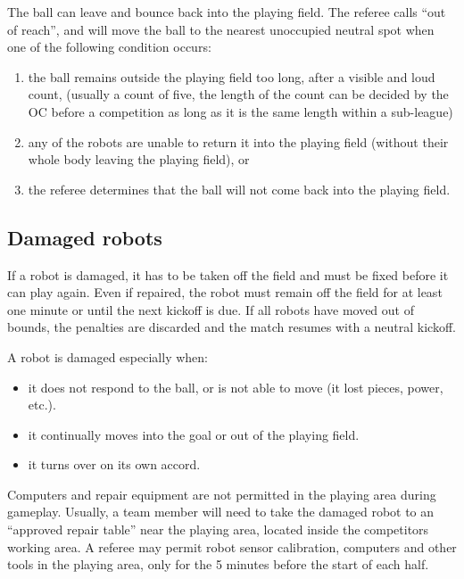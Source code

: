 \documentclass{article}
\begin{document}
The ball can leave and bounce back into the playing field. The referee calls ``out of reach'', and will move the ball to the nearest unoccupied neutral spot when one of the following condition occurs:

\begin{enumerate}
    \item the ball remains outside the playing field too long, after a visible and loud count, (usually a count of five, the length of the count can be decided by the OC before a competition as long as it is the same length within a sub-league)
    \item any of the robots are unable to return it into the playing field (without their whole body leaving the playing field), or
    \item the referee determines that the ball will not come back into the playing field.
\end{enumerate}

\subsection{Damaged robots \label{ref-012}}

If a robot is damaged, it has to be taken off the field and must be fixed before it can play again. Even if repaired, the robot must remain off the field for at least one minute or until the next kickoff is due. If all robots have moved out of bounds, the penalties are discarded and the match resumes with a neutral kickoff.

A robot is damaged especially when:

\begin{itemize}
\item it does not respond to the ball, or is not able to move (it lost pieces, power, etc.).

\item it continually moves into the goal or out of the playing field.

\item it turns over on its own accord.

\end{itemize}

Computers and repair equipment are not permitted in the playing area during gameplay. Usually, a team member will need to take the damaged robot to an ``approved repair table'' near the playing area, located inside the competitors working area. A referee may permit robot sensor calibration, computers and other tools in the playing area, only for the 5 minutes before the start of each half.
\end{document}
